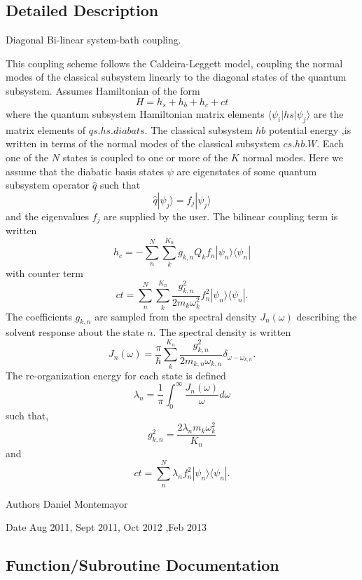 \subsection{Detailed Description}
Diagonal Bi-\/linear system-\/bath coupling. 

This coupling scheme follows the Caldeira-\/\+Leggett model, coupling the normal modes of the classical subsystem linearly to the diagonal states of the quantum subsystem. Assumes Hamiltonian of the form \[ H=h_s+h_b+h_c+ct \] where the quantum subsystem Hamiltonian matrix elements $ \langle\psi_i|hs|\psi_j\rangle $ are the matrix elements of $qs.hs.diabats$. The classical subsystem $ hb $ potential energy ,is written in terms of the normal modes of the classical subsystem $cs.hb.W$. Each one of the $ N$ states is coupled to one or more of the $ K $ normal modes. Here we assume that the diabatic basis states $ \psi $ are eigenstates of some quantum subsystem operator $ \hat q $ such that \[ \hat q |\psi_j\rangle =f_j|\psi_j\rangle \] and the eigenvalues $ f_j $ are supplied by the user. The bilinear coupling term is written \[ h_c=-\sum_n^N \sum_k^{K_n} g_{k,n} Q_{k} f_n |\psi_n\rangle\langle\psi_n|\] with counter term \[ ct=\sum_n^N \sum_k^{K_n} \frac{g_{k,n}^2}{2m_{k}\omega_{k}^2}f_n^2 |\psi_n\rangle\langle\psi_n|. \] The coefficients $ g_{k,n} $ are sampled from the spectral density $ J_n(\omega)$ describing the solvent response about the state $ n $. The spectral density is written \[ J_n(\omega)=\frac{\pi}{\hbar}\sum_k^{K_n}\frac{g_{k,n}^2}{2m_{k,n}\omega_{k,n}}\delta_{\omega-\omega_{k,n}}.\] The re-\/organization energy for each state is defined \[ \lambda_n=\frac{1}{\pi} \int_0^\infty \frac{J_n(\omega)}{\omega} d\omega \] such that, \[ g_{k,n}^2=\frac{2\lambda_n m_{k} \omega_{k}^2}{K_n}\] and \[ ct=\sum_n^N \lambda_n f_n^2|\psi_n\rangle\langle\psi_n| .\] \begin{DoxyAuthor}{Authors}
Daniel Montemayor
\end{DoxyAuthor}
\begin{DoxyDate}{Date}
Aug 2011, Sept 2011, Oct 2012 ,Feb 2013 
\end{DoxyDate}


\subsection{Function/\+Subroutine Documentation}
\mbox{\label{namespacebilinear__class_ab2484d90163983597fb17b15e480e675}} 
